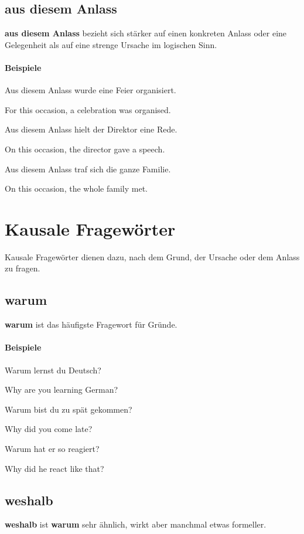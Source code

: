 \documentclass[a4paper]{article}
\newcommand{\EN}[1]{\par{\small\textcolor{TranslationGray}{#1}}\vspace{0.25em}}
\begin{document}
    \subsection{aus diesem Anlass}
    \textbf{aus diesem Anlass} bezieht sich stärker auf einen konkreten Anlass oder eine Gelegenheit als auf eine strenge Ursache im logischen Sinn.
    
    \paragraph{Beispiele}
        Aus diesem Anlass wurde eine Feier organisiert.\\
        \EN{For this occasion, a celebration was organised.}
        
        Aus diesem Anlass hielt der Direktor eine Rede.\\
        \EN{On this occasion, the director gave a speech.}
        
        Aus diesem Anlass traf sich die ganze Familie.\\
        \EN{On this occasion, the whole family met.}
    
    
    \section{Kausale Fragewörter}
    Kausale Fragewörter dienen dazu, nach dem Grund, der Ursache oder dem Anlass zu fragen.
    
    \subsection{warum}
        \textbf{warum} ist das häufigste Fragewort für Gründe.
        
        \paragraph{Beispiele}
            Warum lernst du Deutsch?\\
            \EN{Why are you learning German?}
            
            Warum bist du zu spät gekommen?\\
            \EN{Why did you come late?}
            
            Warum hat er so reagiert?\\
            \EN{Why did he react like that?}
    
    \subsection{weshalb}
    \textbf{weshalb} ist \textbf{warum} sehr ähnlich, wirkt aber manchmal etwas formeller.
    
\end{document}
